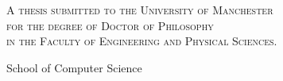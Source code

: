 \begin{titlepage}
	
	
	\begin{center}
		
		\vspace*{1.0in}
		
		{\LARGE\textbf{\thesistitle}}
		
		\vfill
		
		\textsc{A thesis submitted to the University of Manchester\\for the degree of Doctor
		of Philosophy\\in the Faculty of Engineering and Physical Sciences.}
		
		\vfill
		
		\thesisyear
		
		\vfill
		
		\thesisauthor
		
		\vfill
		
		School of Computer Science
		
		\vfill
		
		
	\end{center}
	
\end{titlepage}
